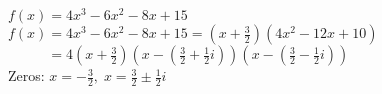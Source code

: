 {$f(x) = 4x^3-6x^2-8x+15$}
{$f(x) = 4x^3-6x^2-8x+15 = \left(x + \frac{3}{2} \right) \left(4x^2-12x+10\right)$ \\
$ \phantom{f(x)} = 4 \left(x + \frac{3}{2} \right) \left(x - \left( \frac{3}{2} + \frac{1}{2}i  \right) \right) \left(x - \left( \frac{3}{2} - \frac{1}{2}i  \right) \right)$\\
Zeros:  $x = - \frac{3}{2}, \; x = \frac{3}{2} \pm \frac{1}{2}i$}
